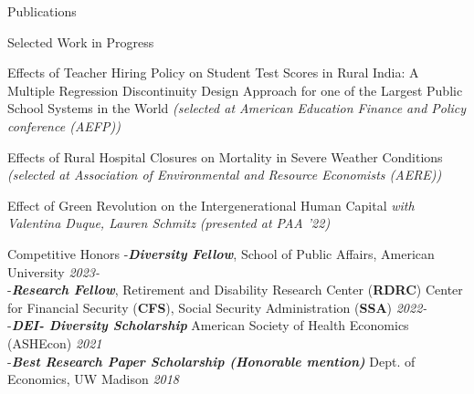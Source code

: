 \documentclass{resume} %
\begin{document}
\begin{rSection}{Publications}
\begin{rSection}{Selected Work in Progress}
\item Effects of Teacher Hiring Policy on Student Test Scores in Rural India: A Multiple Regression Discontinuity Design Approach for one of the Largest Public School Systems in the World \textit{\scriptsize{(selected at American Education Finance and Policy conference (AEFP))}}


\item Effects of Rural Hospital Closures on Mortality in Severe Weather Conditions \textit{\scriptsize{(selected at Association of Environmental and Resource Economists (AERE))}}

\item Effect of Green Revolution on the Intergenerational Human Capital \textit{with Valentina Duque, Lauren Schmitz} \textit{\scriptsize{(presented at PAA '22})}



\end{rSection}




\begin{rSection}{Competitive Honors}
-\textbf{\textit{Diversity Fellow}}, School of Public Affairs, American University \hfill \textit{2023-} \\
-\textbf{\textit{Research Fellow}}, Retirement and Disability Research Center (\textbf{RDRC}) Center for Financial Security (\textbf{CFS}), Social Security Administration (\textbf{SSA})  \hfill \textit{2022-} \\
-\textbf{\textit{DEI- Diversity Scholarship}} American Society of Health Economics (ASHEcon) \hfill \textit{2021} \\
-\textbf{\textit{Best Research Paper Scholarship (Honorable mention)}} Dept. of Economics, UW Madison \hfill \textit{2018}
\end{rSection}





\end{rSection}
\end{document}
